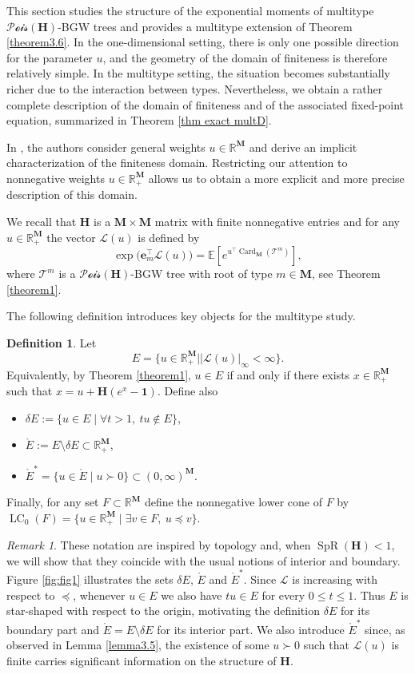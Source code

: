 \documentclass[reqno,final,11pt]{amsart}
\renewcommand{\cite}{\citet}
\theoremstyle{plain}
\theoremstyle{definition}
\newtheorem{definition}[theorem]{Definition}
\theoremstyle{remark}
\newtheorem{remark}[theorem]{Remark}
\newcommand{\R}{\mathds{R}}
\newcommand{\E}[1]{\mathds{E}\left[#1\right]}
\newcommand{\M}{\bm{M}}
\newcommand{\T}{\mathcal{T}}
\renewcommand{\L}{\bm{\mathscr{L}}}
\newcommand{\ones}{\bm{1}}
\newcommand{\e}{\bm{e}}
\renewcommand{\H}{\bm{H}}
\newcommand{\pos}{\R_+^{\M}}
\newcommand{\Pois}{\mathscr{P}\!\mathscr{o}\!\mathscr{i}\!\mathscr{s}}
\newcommand{\CE}{\ce_{0}}
\newcommand{\trp}{^{\intercal}}
\DeclareMathOperator{\card}{Card}
\DeclareMathOperator{\spr}{SpR}
\DeclareMathOperator{\ce}{LC}
\begin{document}
This section studies the structure of the exponential moments of multitype $\Pois(\H)$-BGW trees and provides a multitype extension of Theorem \ref{theorem3.6}. In the one-dimensional setting, there is only one possible direction for the parameter $u$, and the geometry of the domain of finiteness is therefore relatively simple. In the multitype setting, the situation becomes substantially richer due to the interaction between types. Nevertheless, we obtain a rather complete description of the domain of finiteness and of the associated fixed-point equation, summarized in Theorem \ref{thm exact multD}.
 
In \cite{karim_compound_2025}, the authors consider general weights $u\in\R^{\M}$ and derive an implicit characterization of the finiteness domain. Restricting our attention to nonnegative weights $u\in\pos$ allows us to obtain a more explicit and more precise description of this domain.

We recall that $\H$ is a $\M\times \M$ matrix with finite nonnegative entries and for any $u\in\pos$ the vector $\L(u)$ is defined by
\[\exp\big(\e_m \trp \L(u)\big) = \E{e^{u\trp \card_{\M}(\T^m)}}, \]
where $\T^m$ is a $\Pois(\H)$-BGW tree with root of type $m\in\M$, see Theorem \ref{theorem1}. 

The following definition introduces key objects for the multitype study.

\begin{definition}
	Let
	\[E = \{u\in\pos \mid \vert \L(u)\vert_\infty <\infty\}.\]
	Equivalently, by Theorem \ref{theorem1}, $u\in E$ if and only if there exists $x\in\pos$ such that $x=u+\H(e^x-\ones)$. Define also 
	\begin{itemize}
		\item $\delta E := \big\{ u \in E \mid  \forall t>1, \ tu \notin E\big\}$,
		\item $\mathring{E} := E\setminus \delta E \subset \R_+^{\M}$,
		\item $\mathring{E}^* = \{ u\in \mathring{E} \mid u\succ 0\} \subset (0,\infty)^{\M}$.
	\end{itemize}
	Finally, for any set $F\subset \R^{\M}$ define the nonnegative lower cone of $F$ by $\CE(F) = \{ u\in\pos \mid \exists v\in F, \ u\preceq v\}$.
\end{definition}

\begin{remark}
	These notation are inspired by topology and, when $\spr(\H)<1$, we will show that they coincide with the usual notions of interior and boundary. Figure \ref{fig:fig1} illustrates the sets $\delta E$, $\mathring{E}$ and $\mathring{E}^*$. Since $\L$ is increasing with respect to $\preceq$, whenever $u\in E$ we also have $tu\in E$ for every $0\leq t\leq 1$. Thus $E$ is star-shaped with respect to the origin, motivating the definition $\delta E$ for its boundary part and $\mathring{E}=E\setminus\delta E$ for its interior part. We also introduce $\mathring{E}^*$ since, as observed in Lemma \ref{lemma3.5}, the existence of some $u\succ 0$ such that $\L(u)$ is finite carries significant information on the structure of $\H$.
\end{remark}
\end{document}
